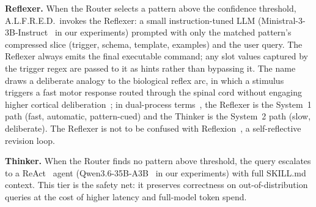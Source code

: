 \textbf{Reflexer.} When the Router selects a pattern above the confidence threshold, A.L.F.R.E.D.\ invokes the Reflexer: a small instruction-tuned LLM (Ministral-3-3B-Instruct~\cite{ministral2025} in our experiments) prompted with only the matched pattern's compressed slice (trigger, schema, template, examples) and the user query. The Reflexer always emits the final executable command; any slot values captured by the trigger regex are passed to it as hints rather than bypassing it. The name draws a deliberate analogy to the biological reflex arc, in which a stimulus triggers a fast motor response routed through the spinal cord without engaging higher cortical deliberation~\cite{sherrington1906}; in dual-process terms~\cite{kahneman2011}, the Reflexer is the System~1 path (fast, automatic, pattern-cued) and the Thinker is the System~2 path (slow, deliberate). The Reflexer is not to be confused with Reflexion~\cite{shinn2023reflexion}, a self-reflective revision loop.

\textbf{Thinker.} When the Router finds no pattern above threshold, the query escalates to a ReAct~\cite{yao2022react} agent (Qwen3.6-35B-A3B~\cite{qwen3_6} in our experiments) with full SKILL.md context. This tier is the safety net: it preserves correctness on out-of-distribution queries at the cost of higher latency and full-model token spend.
